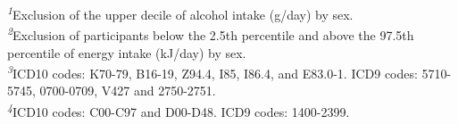 \documentclass[nutrients,article,submit,moreauthors,pdftex]{Definitions/mdpi}
\begin{document}
\begin{table}[t]
\begin{minipage}{\linewidth}
\textsuperscript{\textit{1}}Exclusion of the upper decile of alcohol intake (g/day) by sex.\\
\textsuperscript{\textit{2}}Exclusion of participants below the 2.5th percentile and above the 97.5th percentile of energy intake (kJ/day) by sex.\\
\textsuperscript{\textit{3}}ICD10 codes: K70-79, B16-19, Z94.4, I85, I86.4, and E83.0-1. ICD9 codes: 5710-5745, 0700-0709, V427 and 2750-2751.\\
\textsuperscript{\textit{4}}ICD10 codes: C00-C97 and D00-D48. ICD9 codes: 1400-2399.\\
\end{minipage}
\end{table}

\finishlandscape


\vspace{6pt}













\end{document}

